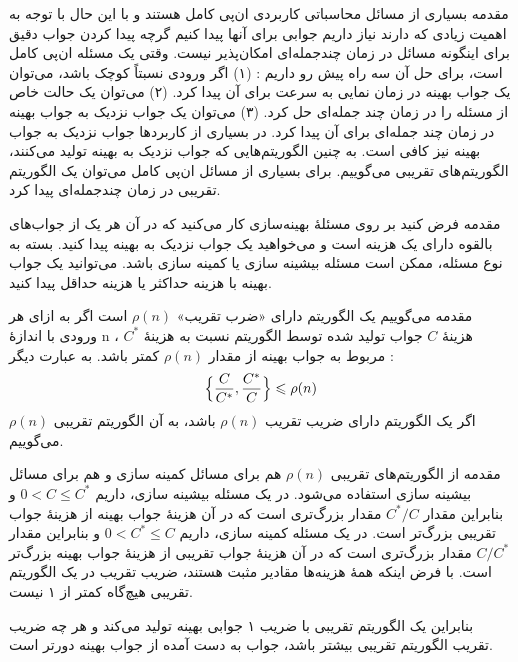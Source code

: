 \begin{itemframe}{مقدمه}
\itm
بسیاری از مسائل محاسباتی کاربردی ان‌پی کامل هستند و با این حال با توجه به اهمیت زیادی که دارند نیاز داریم جوابی برای آنها پیدا کنیم گرچه پیدا کردن جواب دقیق برای اینگونه مسائل در زمان چندجمله‌ای امکان‌پذیر نیست.
\itm
وقتی یک مسئله ان‌پی کامل است، برای حل آن سه راه پیش رو داریم : (۱) اگر ورودی نسبتاً کوچک باشد، می‌توان یک جواب بهینه در زمان نمایی به سرعت برای آن پیدا کرد. (۲) می‌توان یک حالت خاص از مسئله را در زمان چند جمله‌ای حل کرد. (۳) می‌توان یک جواب نزدیک به جواب بهینه در زمان چند جمله‌ای برای آن پیدا کرد. در بسیاری از کاربردها جواب نزدیک به جواب بهینه
نیز کافی است. به چنین الگوریتم‌هایی که جواب نزدیک به بهینه تولید می‌کنند، الگوریتم‌های تقریبی
می‌گوییم. برای بسیاری از مسائل ان‌پی کامل می‌توان یک الگوریتم تقریبی در زمان چندجمله‌ای پیدا کرد.
\end{itemframe}


\begin{itemframe}{مقدمه}
\itm
فرض کنید بر روی مسئلهٔ بهینه‌سازی کار می‌کنید که در آن هر یک از جواب‌های بالقوه
دارای یک هزینه است و می‌خواهید یک جواب نزدیک به بهینه پیدا کنید. بسته به نوع مسئله، ممکن است مسئله بیشینه سازی
یا کمینه سازی
باشد. می‌توانید یک جواب بهینه با هزینه حداکثر یا هزینه حداقل پیدا کنید.
\end{itemframe}

\begin{itemframe}{مقدمه}
\itm
می‌گوییم یک الگوریتم دارای «ضرب تقریب»
$\rho(n)$
است اگر به ازای هر ورودی با اندازهٔ n ، هزینهٔ
$C$
جواب تولید شده توسط الگوریتم نسبت به هزینهٔ
$C^*$
مربوط به جواب بهینه از مقدار
$\rho(n)$
کمتر باشد. به عبارت دیگر :
$$
\Bigl\{ \frac{C}{C^*}, \frac{C^*}{C} \Bigr\} \leqslant \rho(n)
$$
\itm
اگر یک الگوریتم دارای ضریب تقریب
$\rho(n)$
باشد، به آن الگوریتم تقریبی
$\rho(n)$
می‌گوییم.
\end{itemframe}


\begin{itemframe}{مقدمه}
\itm
از الگوریتم‌های تقریبی
$\rho(n)$
هم برای مسائل کمینه سازی و هم برای مسائل بیشینه سازی استفاده می‌شود.
\itm
در یک مسئله بیشینه سازی، داریم
$0 < C \leqslant C^*$
و بنابراین مقدار
$C^*/C$
مقدار بزرگ‌تری است که در آن هزینهٔ جواب بهینه از هزینهٔ جواب تقریبی بزرگ‌تر است.
\itm
در یک مسئله کمینه سازی، داریم
$0 < C^* \leqslant C$
و بنابراین مقدار
$C/C^*$
مقدار بزرگ‌تری است که در آن هزینهٔ جواب تقریبی از هزینهٔ جواب بهینه بزرگ‌تر است.
\itm
با فرض اینکه همهٔ هزینه‌ها مقادیر مثبت هستند، ضریب تقریب در یک الگوریتم تقریبی هیچ‌گاه کمتر از ۱ نیست.
\iffalse
 زیرا اگر داشته باشیم
$C/C^* \leqslant 1$
آنگاه
$C^*/C \geqslant 1$
.
\fi
\itm
بنابراین یک الگوریتم تقریبی با ضریب ۱ جوابی بهینه تولید می‌کند و هر چه ضریب تقریب الگوریتم تقریبی بیشتر باشد، جواب به دست آمده از جواب بهینه دورتر است.
\end{itemframe}


